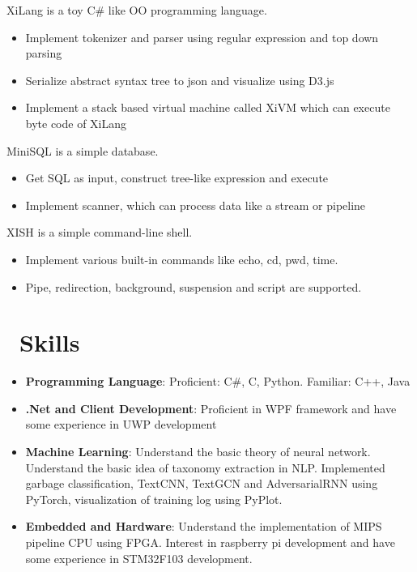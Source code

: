 \documentclass{resume}
\begin{document}
XiLang is a toy C\# like OO programming language.
\begin{itemize}
  \item Implement tokenizer and parser using regular expression and top down parsing
  \item Serialize abstract syntax tree to json and visualize using D3.js
  \item Implement a stack based virtual machine called XiVM which can execute byte code of XiLang
\end{itemize}

MiniSQL is a simple database.
\begin{itemize}
  \item Get SQL as input, construct tree-like expression and execute
  \item Implement scanner, which can process data like a stream or pipeline
\end{itemize}

XISH is a simple command-line shell.
\begin{itemize}
  \item Implement various built-in commands like echo, cd, pwd, time.
  \item Pipe, redirection, background, suspension and script are supported.
\end{itemize}

\section{\faCogs\ Skills}
\begin{itemize}[parsep=0.25ex]
    \item \textbf{Programming Language}:
        Proficient: C\#, C, Python. Familiar: C++, Java

    \item \textbf{.Net and Client Development}:
        Proficient in WPF framework and have some experience in UWP development

    \item \textbf{Machine Learning}:
        Understand the basic theory of neural network. Understand the basic idea of taxonomy extraction in NLP.
        Implemented garbage classification, TextCNN, TextGCN and AdversarialRNN using PyTorch,
        visualization of training log using PyPlot.
    
    \item \textbf{Embedded and Hardware}:
        Understand the implementation of MIPS pipeline CPU using FPGA.
        Interest in raspberry pi development and have some experience in STM32F103 development.
\end{itemize}
\end{document}
